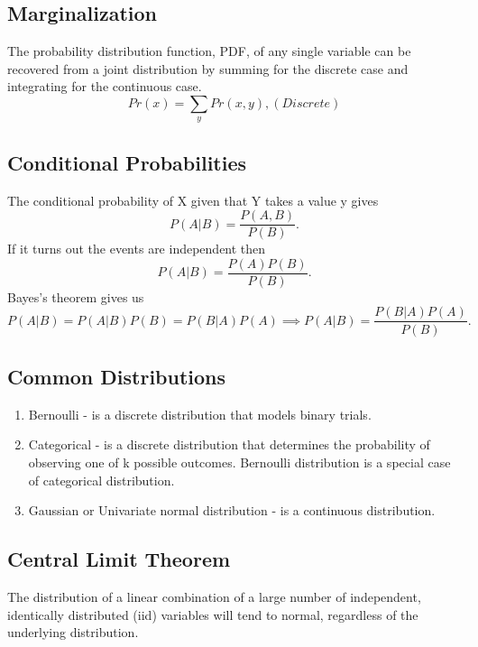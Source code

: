 \documentclass[12pt]{article}
\numberwithin{equation}{section}
\begin{document}
\subsection{Marginalization}
The probability distribution function, PDF, of any single variable can be recovered from a joint distribution by summing for the discrete case and integrating for the continuous case.
\begin{equation}
    Pr(x) = \sum_y Pr(x,y), (Discrete)
\end{equation}

\subsection{Conditional Probabilities}
The conditional probability of X given that Y takes a value y gives
\begin{equation}
    P(A|B) = \frac{P(A, B)}{P(B)}.
\end{equation}
If it turns out the events are independent then
\begin{equation}
    P(A|B) = \frac{P(A) P(B)}{P(B)}.
\end{equation}
Bayes's theorem gives us
\begin{equation}
    P(A | B) = P(A|B)P(B) = P(B|A)P(A) \implies P(A|B) = \frac{P(B|A) P(A) }{P(B)}.
\end{equation}

\subsection{Common Distributions}
\begin{enumerate}
    \item Bernoulli - is a discrete distribution that models binary trials.
    \item Categorical - is a discrete distribution that determines the probability of observing one of k possible outcomes. Bernoulli distribution is a special case of categorical distribution.
    \item Gaussian or Univariate normal distribution - is a continuous distribution.
\end{enumerate}

\subsection{Central Limit Theorem}
The distribution of a linear combination of a large number of
independent, identically distributed (iid) variables will tend to
normal, regardless of the underlying distribution.
\end{document}
